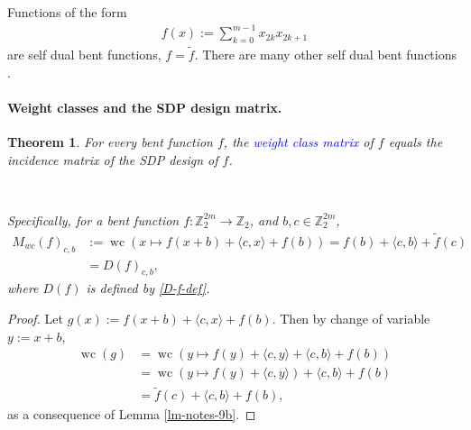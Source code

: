 \documentclass[12pt,a4paper]{article}
\newcommand{\mb}[1]{\mathbb{#1}}
\newcommand{\Z}{\mb{Z}}
\newcommand{\To}{\rightarrow}
\newcommand{\Emph}[1]{\emph{\textcolor{blue}{#1}}}
\newcommand{\dual}[1]{\widetilde{#1}}
\newcommand{\weightclass}[1]{\operatorname{wc}\left(#1\right)}
\newtheorem{Theorem}{Theorem}
\begin{document}

Functions of the form
\begin{align*}
f(x) := \sum_{k=0}^{m-1} x_{2k} x_{2k+1}
\end{align*}
are self dual bent functions, $f=\dual{f}$.
%
%
There are many other self dual bent functions \cite{CarDEPP10self,FeuSSW2013}.

%
\paragraph*{Weight classes and the SDP design matrix.}
\begin{Theorem}
\label{th-Dillon-Schatz}
For every bent function $f$, the \Emph{weight class matrix} of $f$
equals the incidence matrix of the SDP design of $f$.

~

Specifically,
for a bent function $f : \Z_2^{2m} \To \Z_2$, and $b,c \in \Z_2^{2m}$,
\begin{align*}
M_{wc}(f)_{c,b}
&:=
\weightclass{x \mapsto f(x+b) + \langle c, x \rangle + f(b)}
=
f(b) + \langle c, b \rangle + \dual{f}(c)
\\
&=
D(f)_{c,b},
\end{align*}
where $D(f)$ is defined by \eqref{D-f-def}.
\end{Theorem}

\begin{proof}
Let $g(x) := f(x+b) + \langle c, x \rangle + f(b)$.
Then by change of variable $y:=x+b$,
\begin{align*}
\weightclass{g}
&=
\weightclass{y \mapsto f(y) + \langle c, y \rangle + \langle c, b \rangle + f(b)}
\\
&=
\weightclass{y \mapsto f(y) + \langle c, y \rangle} + \langle c, b \rangle + f(b)
\\
&=
\dual{f}(c) + \langle c, b \rangle + f(b),
\end{align*}
as a consequence of Lemma \ref{lm-notes-9b}.
\end{proof}
\end{document}
